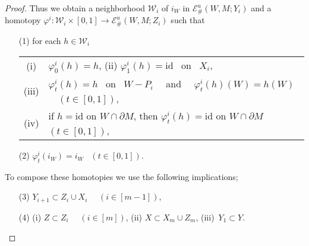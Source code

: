 \documentclass[11pt, fleqn]{amsart}
\theoremstyle{definition}
\renewcommand{\phi}{\varphi}
\newcommand{\lra}{\longrightarrow}
\newcommand{\id}{\mathrm{id}}
\newcommand{\E}{\mathcal E}
\newcommand{\W}{\mathcal W}
\begin{document}
\begin{proof}
Thus we obtain a neighborhood $\W_i$ of $i_W$ in $\E^u_\#(W, M; Y_i)$ and 
a homotopy $\phi^i : \W_i \times [0,1] \lra \E^u_\#(W, M; Z_i)$ such that 
\begin{itemize} 
\item[(1)] for each $h \in \W_i$ \\ 
\begin{tabular}[t]{c@{\ \,}l}
{\rm (i)} & $\phi^i_0(h) = h$, \hspace{3mm} 
{\rm (ii)} $\phi^i_1(h) = \id$ \ on \ $X_i$, \\[2mm] 
{\rm (iii)} & $\phi^i_t(h) = h$ \ on \ $W - P_i$ \ \ and \ \ $\phi^i_t(h)(W) = h(W)$ \ \ $(t \in [0,1])$, \\[2mm] 
{\rm (iv)} & if $h = \id$ on $W \cap \partial M$, then $\phi_t^i(h) = \id$ on $W \cap \partial M$ $(t \in [0,1])$, 
\end{tabular} 
\vskip 1.5mm 
\item[(2)] $\phi^i_t(i_W) = i_W$ \ $(t \in [0,1])$.
\end{itemize} 

To compose these homotopies we use the following implications; 
\begin{itemize}
\item[(3)] $Y_{i+1} \subset Z_i \cup X_i$ \ \ $(i \in [m-1])$, \hspace{5mm}
\item[(4)] (i) $Z \subset Z_i$ \ \ $(i \in [m])$, \hspace{5mm} 
(ii) $X \subset X_m \cup Z_m$, \hspace{5mm} 
(iii) \,$Y_1 \subset Y$. %
\end{itemize}


\end{proof}
\end{document}
